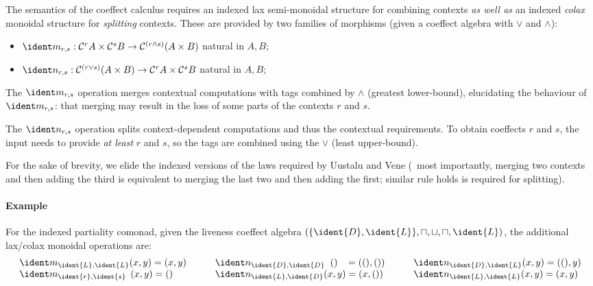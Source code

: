 The semantics of the coeffect calculus requires an indexed
lax semi-monoidal structure for combining contexts \emph{as well as} an indexed
\emph{colax} monoidal structure for \emph{splitting} contexts. These are provided
by two families of morphisms (given a coeffect algebra with $\vee$ and $\wedge$):
%
\begin{itemize}
\item $\cmerge_{r, s} : \ccat^r A \times \ccat^s B \rightarrow \ccat^{(r \wedge s)}(A \times B)$ natural
in $A, B$;
\item $\csplit_{r, s} : \ccat^{(r \vee s)}(A \times B) \rightarrow \ccat^r A \times \ccat^s B$ natural
in $A, B$;
\end{itemize}
%
\noindent
The $\cmerge_{r, s}$ operation merges contextual computations with
tags combined by $\wedge$ (greatest lower-bound), elucidating 
the behaviour of $\cmerge_{r, s}$: that merging may result in 
the loss of some parts of the contexts $r$ and $s$.

The $\csplit_{r, s}$ operation splits context-dependent computations
and thus the contextual requirements. To obtain coeffects $r$ and
$s$, the input needs to provide \emph{at least} $r$ and $s$, so the
tags are combined using the $\vee$ (least upper-bound).

For the sake of brevity, we elide the indexed versions of the laws required by Uustalu and Vene
(\eg~most importantly, merging two contexts and then adding the third is
equivalent to merging the last two and then adding the first; similar rule holds is required
for splitting).

\paragraph{Example}
For the indexed partiality comonad, given the liveness coeffect
algebra $(\{\ident{D}, \ident{L}\}, \sqcap, \sqcup, \sqcap, \ident{L})$,
the additional lax/colax monoidal operations are:
\begin{align*}
\begin{array}{lll}
\cmerge_{\ident{L}, \ident{L}} (x, y) = (x, y) 
  \quad\quad& \csplit_{\ident{D}, \ident{D}} \;\; () \;\;\; = ((), ())
  \quad\quad& \csplit_{\ident{D}, \ident{L}} (x, y) = ((), y) \\
\cmerge_{\ident{r}, \ident{s}} \;\,(x, y) = () 
  & \csplit_{\ident{L}, \ident{D}} (x, y) = (x, ())
  & \csplit_{\ident{L}, \ident{L}} (x, y) = (x, y)
\end{array}
\end{align*}

